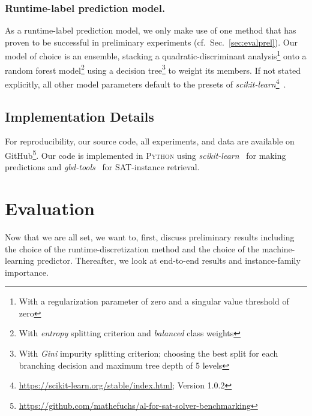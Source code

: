 \documentclass[runningheads]{llncs}
\begin{document}
\subsubsection{Runtime-label prediction model.}
As a runtime-label prediction model, we only make use of one method that has proven to be successful in preliminary experiments (cf.~Sec.~\ref{sec:evalprel}).
Our model of choice is an ensemble, stacking a quadratic-discriminant analysis\footnote{With a regularization parameter of zero and a singular value threshold of zero} onto a random forest model\footnote{With \emph{entropy} splitting criterion and \emph{balanced} class weights} using a decision tree\footnote{With \emph{Gini} impurity splitting criterion; choosing the best split for each branching decision and maximum tree depth of 5 levels} to weight its members.
If not stated explicitly, all other model parameters default to the presets of \emph{scikit-learn}\footnote{\url{https://scikit-learn.org/stable/index.html}; Version 1.0.2}~\cite{scikit-learn}.


\subsection{Implementation Details}
For reproducibility, our source code, all experiments, and data are available on GitHub\footnote{\url{https://github.com/mathefuchs/al-for-sat-solver-benchmarking}}.
Our code is implemented in \textsc{Python} using \emph{scikit-learn}~\cite{scikit-learn} for making predictions and \emph{gbd-tools}~\cite{IserS18} for SAT-instance retrieval.


\section{Evaluation}
\label{sec:eval}
Now that we are all set, we want to, first, discuss preliminary results including the choice of the runtime-discretization method and the choice of the machine-learning predictor.
Thereafter, we look at end-to-end results and instance-family importance.
\end{document}

